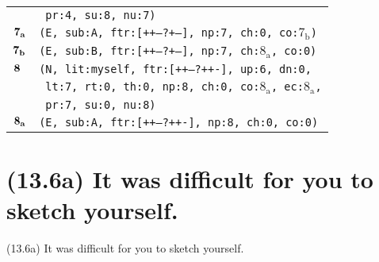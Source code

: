 \documentclass{article}
\begin{document}
\begin{minipage}{\textwidth}
{\begin{tabular}{|r|l|}
    & \texttt{\texttt{~pr:4,~su:8,~nu:7)}} \\
    ${\textbf{\textrm{7}}_{\textbf{\textrm{a}}}}$ & \texttt{\texttt{(E,~sub:A,~ftr:[++---?+--],~np:7,~ch:0,~co:${\textrm{7}_{\textrm{b}}}$)}} \\
    ${\textbf{\textrm{7}}_{\textbf{\textrm{b}}}}$ & \texttt{\texttt{(E,~sub:B,~ftr:[++---?+--],~np:7,~ch:${\textrm{8}_{\textrm{a}}}$,~co:0)}} \\
    ${\textbf{\textrm{8}}_{\phantom{z}}}$ & \texttt{\texttt{(N,~lit:myself,~ftr:[++---?++-],~up:6,~dn:0,}} \\
    & \texttt{\texttt{~lt:7,~rt:0,~th:0,~np:8,~ch:0,~co:${\textrm{8}_{\textrm{a}}}$,~ec:${\textrm{8}_{\textrm{a}}}$,}} \\
    & \texttt{\texttt{~pr:7,~su:0,~nu:8)}} \\
    ${\textbf{\textrm{8}}_{\textbf{\textrm{a}}}}$ & \texttt{\texttt{(E,~sub:A,~ftr:[++---?++-],~np:8,~ch:0,~co:0)}} \\
    \hline
  \end{tabular}
  }
\end{minipage}
\bigbreak

\clearpage

%
%

\section*{(13.6a) It was difficult for you to sketch yourself.}

\bigbreak
\begin{enumerate*}
\item[(13.6a)] It was difficult for you to sketch yourself.
\end{enumerate*}
\bigbreak
\end{document}

